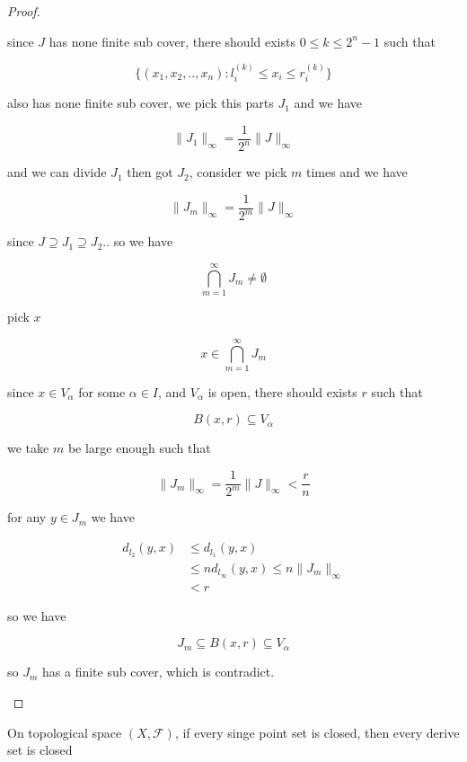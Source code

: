 \begin{proof}
\begin{enumerate}
        since $J$ has none finite sub cover, there should exists $0 \le k \le 2^{n}-1$ such that

        \[
            \{ (x_1, x_2, .., x_n): l_i^{(k)} \le x_i \le r_i^{(k)} \}
        \]

        also has none finite sub cover, we pick this parts $J_1$ and we have

        \[
            \| J_1 \|_{\infty} = \frac{1}{2^n} \| J \|_{\infty}
        \]

        and we can divide $J_1$ then got $J_2$, consider we pick $m$ times and we have

        \[
            \| J_m \|_{\infty} = \frac{1}{2^{m}} \| J \|_{\infty}
        \]

        since  $J \supseteq J_1 \supseteq J_2 .. $ so we have

        \[
            \bigcap_{m=1}^{\infty}J_m \ne \emptyset
        \]

        pick $x$

        \[
            x \in \bigcap_{m=1}^{\infty}J_m 
        \]

        since $x \in V_{\alpha}$ for some $\alpha \in I$, and $V_{\alpha}$ is open, there should exists $r$ such that

        \[
            B(x, r) \subseteq V_{\alpha}
        \]

        we take $m$ be large enough such that

        \[
 \| J_m \|_{\infty}  = \frac{1}{2^{m}} \| J \|_{\infty} < \frac{r}{n}
        \]

        for any $y \in J_m$ we have

        \begin{align*}
            d_{l_2}(y,x) & \le d_{l_1}(y,x) \\
            & \le n d_{l_\infty}(y,x) \le n  \| J_m \|_{\infty} \\
            & < r
        \end{align*}

        so we have

        \[
            J_m \subseteq B(x, r) \subseteq V_{\alpha}
        \]

        so $J_m$ has a finite sub cover, which is contradict.

    \end{enumerate} 
\end{proof}

\begin{exercise}
    On topological space $(X, \mathcal{F})$, if every singe point set is closed, then every derive set is closed 
\end{exercise}

